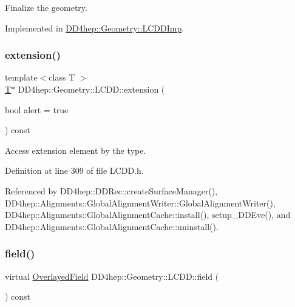 Finalize the geometry. 



Implemented in \hyperlink{class_d_d4hep_1_1_geometry_1_1_l_c_d_d_imp_aa3fa37aa7608b67f95aa644dc381389f}{D\+D4hep\+::\+Geometry\+::\+L\+C\+D\+D\+Imp}.

\hypertarget{class_d_d4hep_1_1_geometry_1_1_l_c_d_d_aa086a5063988b9f7ac9cb98dee1393a4}{}\label{class_d_d4hep_1_1_geometry_1_1_l_c_d_d_aa086a5063988b9f7ac9cb98dee1393a4} 
\subsubsection{\texorpdfstring{extension()}{extension()}}
{\footnotesize\ttfamily template$<$class T $>$ \\
\hyperlink{class_t}{T}$\ast$ D\+D4hep\+::\+Geometry\+::\+L\+C\+D\+D\+::extension (\begin{DoxyParamCaption}\item[{bool}]{alert = {\ttfamily true} }\end{DoxyParamCaption}) const\hspace{0.3cm}{\ttfamily [inline]}}



Access extension element by the type. 



Definition at line 309 of file L\+C\+D\+D.\+h.



Referenced by D\+D4hep\+::\+D\+D\+Rec\+::create\+Surface\+Manager(), D\+D4hep\+::\+Alignments\+::\+Global\+Alignment\+Writer\+::\+Global\+Alignment\+Writer(), D\+D4hep\+::\+Alignments\+::\+Global\+Alignment\+Cache\+::install(), setup\+\_\+\+D\+D\+Eve(), and D\+D4hep\+::\+Alignments\+::\+Global\+Alignment\+Cache\+::uninstall().

\hypertarget{class_d_d4hep_1_1_geometry_1_1_l_c_d_d_a62750fbd02e0f4e06c570d00dc9eb2ca}{}\label{class_d_d4hep_1_1_geometry_1_1_l_c_d_d_a62750fbd02e0f4e06c570d00dc9eb2ca} 
\subsubsection{\texorpdfstring{field()}{field()}\hspace{0.1cm}{\footnotesize\ttfamily [1/2]}}
{\footnotesize\ttfamily virtual \hyperlink{class_d_d4hep_1_1_geometry_1_1_overlayed_field}{Overlayed\+Field} D\+D4hep\+::\+Geometry\+::\+L\+C\+D\+D\+::field (\begin{DoxyParamCaption}{ }\end{DoxyParamCaption}) const\hspace{0.3cm}{\ttfamily [pure virtual]}}



